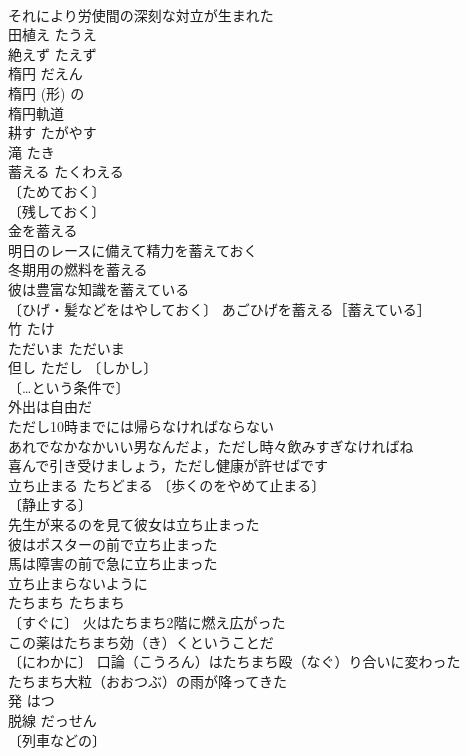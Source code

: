\documentclass[8pt]{extreport}
\begin{document}
\begin{CJK}{UTF8}{min}
\\	それにより労使間の深刻な対立が生まれた 
\\	田植え	たうえ	
\\	絶えず	たえず	
\\	楕円	だえん	
\\	楕円 (形) の 
\\	楕円軌道 
\\	耕す	たがやす	
\\	滝	たき	
\\	蓄える	たくわえる	
\\	〔ためておく〕
\\	〔残しておく〕
\\	金を蓄える 
\\	明日のレースに備えて精力を蓄えておく 
\\	冬期用の燃料を蓄える 
\\	彼は豊富な知識を蓄えている 
\\	〔ひげ・髪などをはやしておく〕 あごひげを蓄える［蓄えている］ 
\\	竹	たけ	
\\	ただいま	ただいま	
\\	但し	ただし	〔しかし〕
\\	〔…という条件で〕
\\	外出は自由だ
\\	ただし10時までには帰らなければならない 
\\	あれでなかなかいい男なんだよ，ただし時々飲みすぎなければね 
\\	喜んで引き受けましょう，ただし健康が許せばです 
\\	立ち止まる	たちどまる	〔歩くのをやめて止まる〕
\\	〔静止する〕
\\	先生が来るのを見て彼女は立ち止まった 
\\	彼はポスターの前で立ち止まった 
\\	馬は障害の前で急に立ち止まった 
\\	立ち止まらないように 
\\	たちまち	たちまち	
\\	〔すぐに〕 火はたちまち2階に燃え広がった 
\\	この薬はたちまち効（き）くということだ 
\\	〔にわかに〕 口論（こうろん）はたちまち殴（なぐ）り合いに変わった 
\\	たちまち大粒（おおつぶ）の雨が降ってきた 
\\	発	はつ	
\\	脱線	だっせん	
\\	〔列車などの〕

\end{CJK}
\end{document}
